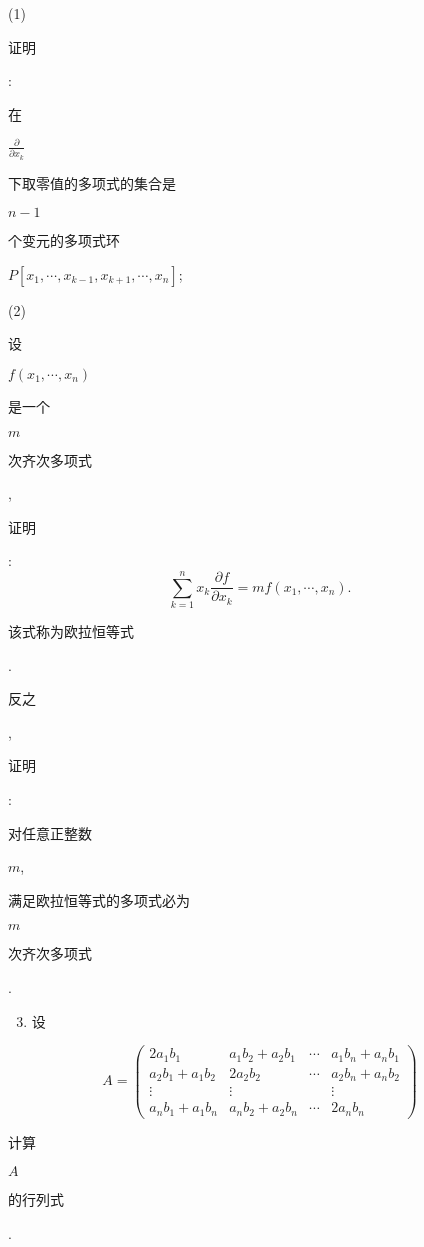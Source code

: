 \documentclass[10pt]{article}
\begin{document}
(1) \begin{CJK}{UTF8}{mj}证明\end{CJK}: \begin{CJK}{UTF8}{mj}在\end{CJK} $\frac{\partial}{\partial x_{k}}$ \begin{CJK}{UTF8}{mj}下取零值的多项式的集合是\end{CJK} $n-1$ \begin{CJK}{UTF8}{mj}个变元的多项式环\end{CJK} $P\left[x_{1}, \cdots, x_{k-1}, x_{k+1}, \cdots, x_{n}\right]$;

(2) \begin{CJK}{UTF8}{mj}设\end{CJK} $f\left(x_{1}, \cdots, x_{n}\right)$ \begin{CJK}{UTF8}{mj}是一个\end{CJK} $m$ \begin{CJK}{UTF8}{mj}次齐次多项式\end{CJK}, \begin{CJK}{UTF8}{mj}证明\end{CJK}:
$$
\sum_{k=1}^{n} x_{k} \frac{\partial f}{\partial x_{k}}=m f\left(x_{1}, \cdots, x_{n}\right) .
$$
\begin{CJK}{UTF8}{mj}该式称为欧拉恒等式\end{CJK}. \begin{CJK}{UTF8}{mj}反之\end{CJK}, \begin{CJK}{UTF8}{mj}证明\end{CJK}: \begin{CJK}{UTF8}{mj}对任意正整数\end{CJK} $m$, \begin{CJK}{UTF8}{mj}满足欧拉恒等式的多项式必为\end{CJK} $m$ \begin{CJK}{UTF8}{mj}次齐次多项式\end{CJK}.

\begin{enumerate}
  \setcounter{enumi}{2}
  \item \begin{CJK}{UTF8}{mj}设\end{CJK}
\end{enumerate}
$$
A=\left(\begin{array}{cccc}
2 a_{1} b_{1} & a_{1} b_{2}+a_{2} b_{1} & \cdots & a_{1} b_{n}+a_{n} b_{1} \\
a_{2} b_{1}+a_{1} b_{2} & 2 a_{2} b_{2} & \cdots & a_{2} b_{n}+a_{n} b_{2} \\
\vdots & \vdots & & \vdots \\
a_{n} b_{1}+a_{1} b_{n} & a_{n} b_{2}+a_{2} b_{n} & \cdots & 2 a_{n} b_{n}
\end{array}\right)
$$
\begin{CJK}{UTF8}{mj}计算\end{CJK} $A$ \begin{CJK}{UTF8}{mj}的行列式\end{CJK}.
\end{document}
